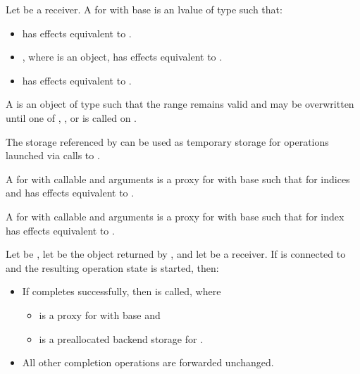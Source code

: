 \pnum
Let  be a receiver.
A  for  with base  is
an lvalue  of type  such that:
\begin{itemize}
\item
{} has effects equivalent to
.
\item
{}, where  is an  object,
has effects equivalent to .
\item
{} has effects equivalent to
.
\end{itemize}

\pnum
A   is
an object  of type 
such that the range  remains valid and may be overwritten
until one of , , or 
is called on .
\begin{note}
The storage referenced by  can be used as temporary storage
for operations launched via calls to .
\end{note}

\pnum
A  for 
with callable  and arguments 
is a proxy  for 
with base 
such that
 for indices  and 
has effects equivalent to .

\pnum
A  for 
with callable  and arguments 
is a proxy  for 
with base 
such that
 for index 
has effects equivalent to .

\pnum
Let  be ,
let  be the object returned by , and
let  be a receiver.
If  is connected to  and
the resulting operation state is started, then:
\begin{itemize}
\item
If  completes successfully,
then  is called, where
\begin{itemize}
\item
{} is a proxy for 
with base  and
\item
{} is a preallocated backend storage for .
\end{itemize}
\item
All other completion operations are forwarded unchanged.
\end{itemize}

